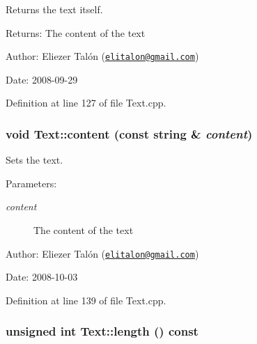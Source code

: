 Returns the text itself. 

\begin{Desc}
\item[Returns:]The content of the text\end{Desc}
\begin{Desc}
\item[Author:]Eliezer Talón (\href{mailto:elitalon@gmail.com}{\tt elitalon@gmail.com}) \end{Desc}
\begin{Desc}
\item[Date:]2008-09-29 \end{Desc}


Definition at line 127 of file Text.cpp.\hypertarget{class_text_6be01035a20918e8c242ae310ff81bed}{
\subsubsection[content]{\setlength{\rightskip}{0pt plus 5cm}void Text::content (const string \& {\em content})}}
\label{class_text_6be01035a20918e8c242ae310ff81bed}


Sets the text. 

\begin{Desc}
\item[Parameters:]
\begin{description}
\item[{\em content}]The content of the text\end{description}
\end{Desc}
\begin{Desc}
\item[Author:]Eliezer Talón (\href{mailto:elitalon@gmail.com}{\tt elitalon@gmail.com}) \end{Desc}
\begin{Desc}
\item[Date:]2008-10-03 \end{Desc}


Definition at line 139 of file Text.cpp.\hypertarget{class_text_8d76db538f8617fb8880ba3e4ff3e6a5}{
\subsubsection[length]{\setlength{\rightskip}{0pt plus 5cm}unsigned int Text::length () const}}
\label{class_text_8d76db538f8617fb8880ba3e4ff3e6a5}


